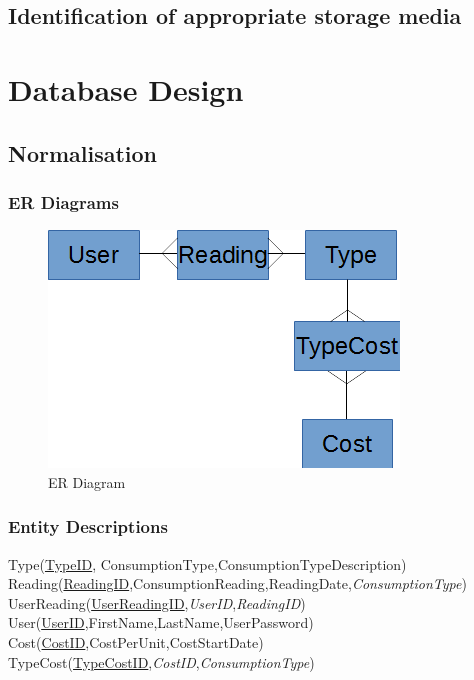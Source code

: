 \subsection{Identification of appropriate storage media}

\section{Database Design}

\subsection{Normalisation}

\subsubsection{ER Diagrams}
\begin{figure}[H]
\includegraphics{./design/ER Diagrams.png}
\caption{ER Diagram}
\end{figure}

\subsubsection{Entity Descriptions}
Type(\underline{TypeID}, ConsumptionType,ConsumptionTypeDescription) \\
Reading(\underline{ReadingID},ConsumptionReading,ReadingDate,\emph{ConsumptionType}) \\
UserReading(\underline{UserReadingID},\emph{UserID},\emph{ReadingID}) \\
User(\underline{UserID},FirstName,LastName,UserPassword) \\
Cost(\underline{CostID},CostPerUnit,CostStartDate) \\
TypeCost(\underline{TypeCostID},\emph{CostID},\emph{ConsumptionType})\\

